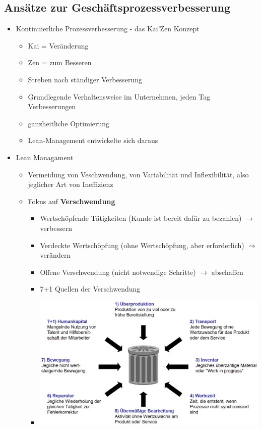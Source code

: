 \documentclass[11pt,a4paper]{article}
\begin{document}
\subsection{Ansätze zur Geschäftsprozessverbesserung}
\begin{itemize}
\item Kontinuierliche Prozessverbesserung - das Kai'Zen Konzept
	\begin{itemize}
	\item Kai = Veränderung
	\item Zen = zum Besseren
	\item Streben nach ständiger Verbesserung
	\item Grundlegende Verhaltensweise im Unternehmen, jeden Tag Verbesserungen
	\item ganzheitliche Optimierung
	\item Lean-Management entwickelte sich daraus
	\end{itemize}
	
\item Lean Managament
	\begin{itemize}
	\item Vermeidung von Veschwendung, von Variabilität und Inflexibilität, also jeglicher Art von Ineffizienz
	\item Fokus auf \textbf{Verschwendung}
		\begin{itemize}
		\item Wertschöpfende Tätigkeiten (Kunde ist bereit dafür zu bezahlen) $\rightarrow$ verbessern
		\item Verdeckte Wertschöpfung (ohne Wertschöpfung, aber erforderlich) $\Rightarrow$ verändern
		\item Offene Verschwendung (nicht notwendige Schritte) $\rightarrow$ abschaffen
		\item 7+1 Quellen der Verschwendung
		\vspace{0.3cm}
		\item[]	\includegraphics[width=15cm]{Bilder/verschwendung}				
		\end{itemize}
	

\end{itemize}
\end{itemize}
\end{document}
